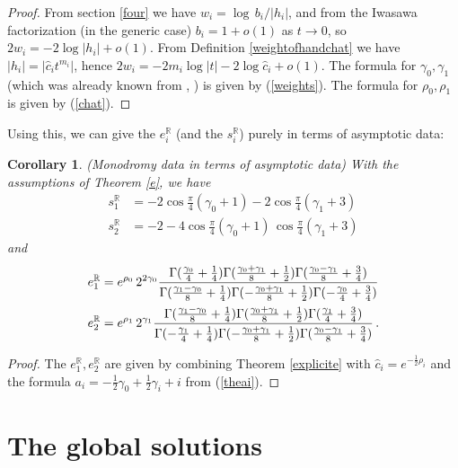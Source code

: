 \documentclass[a4paper,12pt,leqno]{amsart}
\numberwithin{equation}{section}
\theoremstyle{plain}
\newtheorem{corollary}[theorem]{Corollary}
\theoremstyle{definition}
\newcommand{\R}{\mathbb R}
\newcommand{\ga}{\gamma}
\newcommand{\Ga}{\Gamma}
\newcommand{\nn}{m}
\newcommand{\pga}{\vphantom{{A_A}_A}\ga}  %
\begin{document}
\begin{proof} From section \ref{four} we have $w_i=\log\,  b_i/\vert h_i\vert$, and from the Iwasawa factorization (in the generic case) $b_i=1+o(1)$ as $t\to 0$, so
$2w_i=-2\log \vert h_i\vert + o(1)$.  From Definition \ref{weightofhandchat} we have 
$\vert h_i\vert =\vert\hat c_i t^{\nn_i}\vert$, hence 
$2w_i=-2\nn_i \log\vert t\vert - 2\log \hat c_i +o(1)$.
The formula for $\ga_0,\ga_1$ (which was already known from \cite{GuItLiXX}, \cite{GuItLi15}) is given by (\ref{weights}). 
The formula for $\rho_0,\rho_1$ is given by (\ref{chat}).  
\end{proof}

Using this, we can give the $e_i^\R$ (and the $s_i^\R$) purely in terms of asymptotic data:

\begin{corollary}\label{expliciteasymp} 
{\em(Monodromy data in terms of asymptotic data)}
With the assumptions of Theorem \ref{e}, we have 
\begin{align*}
s_1^\R &= -2\cos \tfrac\pi4 { (\ga_0+1)} -  2\cos \tfrac\pi4 {(\ga_1+3)}
\\
s_2^\R &= -2-4\cos \tfrac\pi4 {(\ga_0+1)} \, \cos \tfrac\pi4 {(\ga_1+3)}
\end{align*}
and
\begin{align*}
e^\R_1&=
e^{\rho_0}\,
2^{2\ga_0}
\frac
{
\Ga(  \frac{\pga_0}{4}+\frac14  )
\Ga(  \frac{\pga_0+\pga_1}{8}+\frac12 )
\Ga(  \frac{\pga_0-\pga_1}{8}+\frac34  )
}
{
\Ga(  \frac{\pga_1-\pga_0}{8}+\frac14  )
\Ga(  -\frac{\pga_0+\pga_1}{8}+\frac12  )
\Ga(  -\frac{\pga_0}{4}+\frac34  )
}
\\
e^\R_2&= e^{\rho_1}\,
2^{\ga_1}
\frac
{
\Ga(  \frac{\pga_1-\pga_0}{8}+\frac14  )
\Ga(  \frac{\pga_0+\pga_1}{8}+\frac12 )
\Ga(  \frac{\pga_1}{4}+\frac34  )
}
{
\Ga(  -\frac{\pga_1}{4}+\frac14  )
\Ga(  -\frac{\pga_0+\pga_1}{8}+\frac12  )
\Ga(  \frac{\pga_0-\pga_1}{8}+\frac34  )
}\, .
\end{align*}
\end{corollary}

\begin{proof}
The $e^\R_1,e^\R_2$ are given by combining Theorem \ref{explicite} with $\hat c_i=e^{-\frac12\rho_i}$ and the formula
$a_i=-\tfrac12 \ga_0 + \tfrac12 \ga_i + i$ from (\ref{theai}).
\end{proof}



\section{The global solutions}\label{conclusions}
\end{document}
